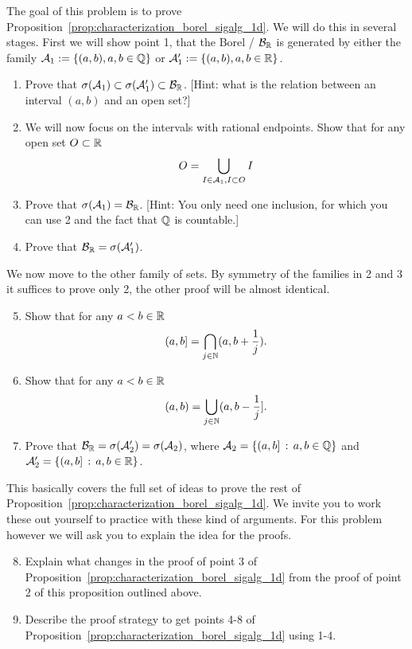\begin{problem}\label{prb:borel_sigalg_1d}
The goal of this problem is to prove Proposition~\ref{prop:characterization_borel_sigalg_1d}. We will do this in several stages. First we will show point 1, that the Borel \sigalg/ $\mathcal B_{\mathbb R}$ is generated by either the family $\mathcal A_1 := \{(a, b), a,b \in \mathbb Q\}$ or $\mathcal A_1^\prime := \{(a, b), a,b \in \mathbb R\}$.

\begin{enumerate}
\item Prove that $\sigma(\mathcal A_1) \subset \sigma(\mathcal A_1^\prime) \subset \mathcal B_{\mathbb R}$. [Hint: what is the relation between an interval $(a,b)$ and an open set?]
\item We will now focus on the intervals with rational endpoints. Show that for any open set $O \subset \mathbb R$
\[
	O = \bigcup_{I \in \mathcal A_1, I \subset O} I
\]
\item Prove that $\sigma(\mathcal A_1) = \mathcal B_{\mathbb R}$. [Hint: You only need one inclusion, for which you can use 2 and the fact that $\mathbb Q$ is countable.]
\item Prove that $\mathcal B_{\mathbb R} = \sigma(\mathcal A_1^\prime)$.
\end{enumerate}

We now move to the other family of sets. By symmetry of the families in 2 and 3 it suffices to prove only 2, the other proof will be almost identical.
\begin{enumerate}
\setcounter{enumi}{4}
\item Show that for any $a < b \in \mathbb R$
\[
	(a,b] = \bigcap_{j \in \mathbb N} (a, b+\frac{1}{j}).
\]
\item Show that for any $a < b \in \mathbb R$
\[
	(a,b) = \bigcup_{j \in \mathbb N} (a,b-\frac{1}{j}].
\]
\item Prove that $\mathcal B_{\mathbb R} = \sigma(\mathcal A_2^\prime) = \sigma(\mathcal A_2)$, where $\mathcal A_2 = \{(a,b] \, : \, a,b \in \mathbb Q\}$ and $\mathcal A_2^\prime = \{(a,b] \, : \, a,b \in \mathbb R\}$.
\end{enumerate}

This basically covers the full set of ideas to prove the rest of Proposition~\ref{prop:characterization_borel_sigalg_1d}. We invite you to work these out yourself to practice with these kind of arguments. For this problem however we will ask you to explain the idea for the proofs.
\begin{enumerate}
\setcounter{enumi}{7}
\item Explain what changes in the proof of point 3 of Proposition~\ref{prop:characterization_borel_sigalg_1d} from the proof of point 2 of this proposition outlined above.
\item Describe the proof strategy to get points 4-8 of Proposition~\ref{prop:characterization_borel_sigalg_1d} using 1-4.
\end{enumerate}
\end{problem}

